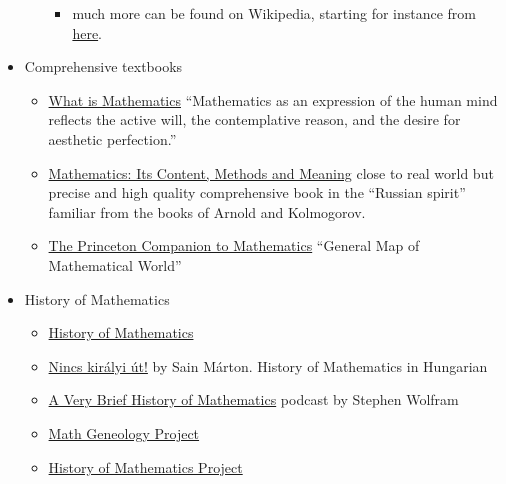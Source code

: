 \documentclass{article}
\begin{document}
\begin{itemize}
\begin{itemize}
\begin{itemize}
            \item much more can be found on Wikipedia, starting for instance from \href{https://en.wikipedia.org/wiki/List_of_open-source_software_for_mathematics}{here}.
        \end{itemize}
    \end{itemize}
    
    \item Comprehensive textbooks
    \begin{itemize}
        \item \href{https://www.goodreads.com/book/show/584620.What_Is_Mathematics_}{What is Mathematics} ``Mathematics as an expression of the human mind reflects the active will, the contemplative reason, and the desire for aesthetic perfection.''
        
        \item \href{https://www.goodreads.com/book/show/405880.Mathematics}{Mathematics: Its Content, Methods and Meaning} close to real world but precise and high quality comprehensive book in the ``Russian spirit'' familiar from the books of Arnold and Kolmogorov.
        
        \item \href{https://www.goodreads.com/book/show/1471873.The_Princeton_Companion_to_Mathematics}{The Princeton Companion to Mathematics} ``General Map of Mathematical World''
    \end{itemize}
    
    \item History of Mathematics
    \begin{itemize}
        \item \href{https://www.goodreads.com/book/show/786570.A_History_of_Mathematics}{History of Mathematics}
        \item \href{https://mek.oszk.hu/05000/05052/}{Nincs királyi út!} by Sain Márton. History of Mathematics in Hungarian
        \item \href{https://soundcloud.com/stephenwolfram/a-very-brief-history-of-mathematics}{A Very Brief History of Mathematics} podcast by Stephen Wolfram
        \item \href{https://genealogy.math.ndsu.nodak.edu/index.php}{Math Geneology Project}
        \item \href{https://history-of-mathematics.org/}{History of Mathematics Project}
    \end{itemize}
    
    
    
    
    

\end{itemize}
\end{document}

